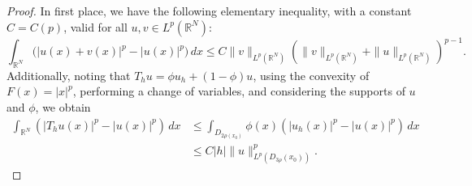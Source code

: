 \documentclass[]{amsart}
\theoremstyle{definition}
\theoremstyle{definition}
\theoremstyle{remark}
\numberwithin{equation}{section}
\begin{document}
\begin{proof}
  In first place, we have the following elementary inequality, with a constant $C = C(p)$, valid for all $u, v \in L^p(\mathbb{R}^N)$:
	\begin{equation}
		\label{Regularidad: Regularidad de F_2 cota auxiliar savare 1}
    \int_{\mathbb{R}^N} \big( |u(x) + v(x)|^p - |u(x)|^p \big) \, dx \leq C \|v\|_{L^p(\mathbb{R}^N)} \left( \|v\|_{L^p(\mathbb{R}^N)} + \|u\|_{L^p(\mathbb{R}^N)} \right)^{p-1}.
	\end{equation}
Additionally, noting that $T_h u = \phi u_h + (1-\phi) u$, using the convexity of \( F(x) = |x|^p \), performing a change of variables, and considering the supports of \( u \) and \( \phi \), we obtain
	\begin{equation}
		\label{Regularidad: Regularidad de F_2 cota auxiliar savare 2} \begin{split}
		\int_{\mathbb{R}^N} \left( |T_h u(x)|^p - |u(x)|^p \right)\, dx
        & \le \int_{D_{2\rho(x_0)}} \phi(x) \left(|u_h(x)|^p - |u(x)|^p \right) \, dx \\
        & \leq C |h| \|u\|_{L^p(D_{3\rho}(x_0))}^p.
\end{split}	\end{equation}
	

\end{proof}
\end{document}
